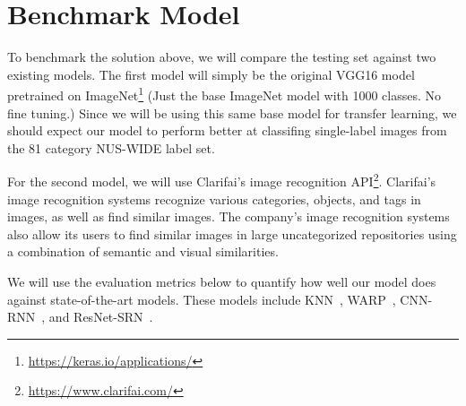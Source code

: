 \documentclass[10pt, a4paper, twocolumn]{article} %
\begin{document}
\section{Benchmark Model\label{sec:5}} %


To benchmark the solution above, we will compare the testing set against two existing models.  The first model will simply be the original VGG16 model pretrained on ImageNet\footnote{\url{https://keras.io/applications/}} (Just the base ImageNet model with 1000 classes. No fine tuning.) Since we will be using this same base model for transfer learning, we should expect our model to perform better at classifing single-label images from the 81 category NUS-WIDE label set.

For the second model, we will use Clarifai's image recognition API\footnote{\url{https://www.clarifai.com/}}.  Clarifai’s image recognition systems recognize various categories, objects, and tags in images, as well as find similar images. The company’s image recognition systems also allow its users to find similar images in large uncategorized repositories using a combination of semantic and visual similarities.  

We will use the evaluation metrics below to quantify how well our model does against state-of-the-art models. These models include KNN~\cite{nus-wide-civr09}, WARP~\cite{GongJLTI13}, CNN-RNN~\cite{WangYMHHX16}, and ResNet-SRN~\cite{ZhuLOYW17}.



\end{document}
